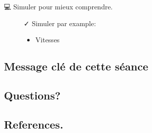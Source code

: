 \documentclass[
  ignorenonframetext,
  aspectratio=169,
  c]{beamer}
\providecommand{\tightlist}{%
  \setlength{\itemsep}{0pt}\setlength{\parskip}{0pt}}\usepackage{longtable,booktabs,array}
\begin{document}
\begin{frame}{💻 Simuler pour mieux comprendre.}
\begin{figure}

\begin{minipage}{0.50\linewidth}
✓ Simuler par example:

\begin{itemize}
\tightlist
\item
  Vitesses
\end{itemize}

\end{minipage}%
%
\begin{minipage}{0.50\linewidth}

\end{minipage}%
\newline
\begin{minipage}{0.50\linewidth}

\end{minipage}%

\end{figure}%
\end{frame}

\subsection{Message clé de cette
séance}\label{message-cluxe9-de-cette-suxe9ance}

\subsection{Questions?}\label{questions}

\subsection{References.}\label{references.}
\end{document}
